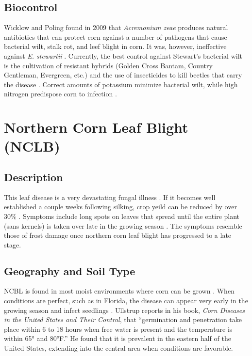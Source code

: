 \documentclass[letterpaper, 12pt]{report}
\begin{document}
\subsection{Biocontrol}

Wicklow and Poling found in 2009 that \emph{Acremonium zeae} produces natural antibiotics that can protect corn against a number of pathogens that cause bacterial wilt, stalk rot, and leef blight in corn. It was, however, ineffective against \emph{E. stewartii} \autocite{wicklow2009antimicrobial}. Currently, the best control against Stewart's bacterial wilt is the cultivation of resistant hybrids (Golden Cross Bantam, Country Gentleman, Evergreen, etc.) and the use of insecticides to kill beetles that carry the disease \autocite{ullstrup1961corn}. Correct amounts of potassium minimize bacterial wilt, while high nitrogen predispose corn to infection \autocite{ullstrup1961corn}.


\section[N. Corn Leaf Blight]{Northern Corn Leaf Blight (NCLB)}

\subsection{Description}

This leaf disease is a very devastating fungal illness \autocite{zhang2021klebsiella}. If it becomes well established a couple weeks following silking, crop yeild can be reduced by over 30\% \autocite{ullstrup1961corn}. Symptoms include long spots on leaves that spread until the entire plant (sans kernels) is taken over late in the growing season \autocite{ullstrup1961corn}. The symptoms resemble those of frost damage once northern corn leaf blight has progressed to a late stage.

\subsection{Geography and Soil Type}

NCBL is found in most moist environments where corn can be grown \autocite{ullstrup1961corn}. When conditions are perfect, such as in Florida, the disease can appear very early in the growing season and infect seedlings \autocite{ullstrup1961corn}. Ullstrup reports in his book, \emph{Corn Diseases in the United States and Their Control}, that ``germination and penetration take place within 6 to 18 hours when free water is present and the temperature is within 65° and 80°F.'' He found that it is prevalent in the eastern half of the United States, extending into the central area when conditions are favorable.
\end{document}
